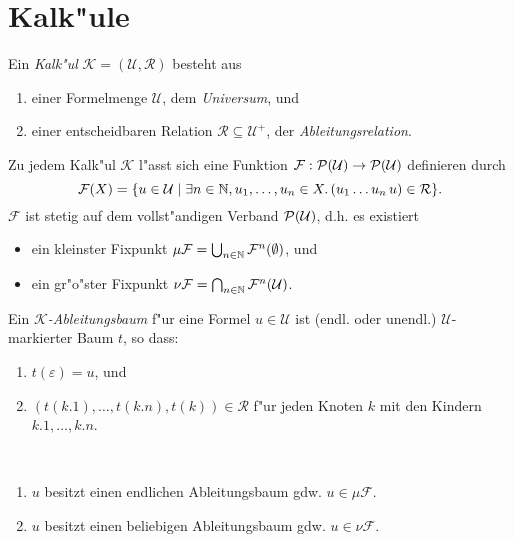 \documentclass[12pt,a4paper,final]{article}
\begin{document}

\section{Kalk"ule}
\label{sec:Kalkuele}

\begin{definition}[Kalk"ul]
  Ein \emph{Kalk"ul} \mbox{$\mathcal{K} = (\mathcal{U}, \mathcal{R})$} besteht aus
  \begin{enumerate}
  \item einer Formelmenge $\mathcal{U}$, dem \emph{Universum}, und
  \item einer entscheidbaren Relation $\mathcal{R} \subseteq \mathcal{U}^+$, der \emph{Ableitungsrelation}.
  \end{enumerate}
\end{definition}
Zu jedem Kalk"ul $\mathcal{K}$ l"asst sich eine Funktion
\mbox{$\mathcal{F}:\operatorname{\mathcal{P}}(\mathcal{U}) \to \operatorname{\mathcal{P}}(\mathcal{U})$} definieren durch
\begin{equation*}
\mathcal{F}(X) = \{u \in \mathcal{U} \mid \exists n\in\mathbb N,u_1,\ldots,u_n\in X.\,(u_1 \ldots u_n\,u) \in\mathcal{R}\}.
\end{equation*}
$\mathcal{F}$ ist stetig auf dem vollst"andigen Verband $\operatorname{\mathcal{P}}(\mathcal{U})$, d.h. es
existiert
\begin{itemize}
\item ein kleinster Fixpunkt $\mu\mathcal{F} = \bigcup_{n\in\mathbb N}\mathcal{F}^n(\emptyset)$, und
\item ein gr"o"ster Fixpunkt $\nu\mathcal{F} = \bigcap_{n\in\mathbb N}\mathcal{F}^n(\mathcal{U})$.
\end{itemize}
Ein \emph{$\mathcal{K}$-Ableitungsbaum} f"ur eine Formel $u \in \mathcal{U}$ ist (endl. oder unendl.)
$\mathcal{U}$-markierter Baum $t$, so dass:
\begin{enumerate}
\item $t(\varepsilon) = u$, und
\item $(t(k.1),\ldots,t(k.n),t(k)) \in \mathcal{R}$ f"ur jeden Knoten $k$ mit den Kindern $k.1,\ldots,k.n$.
\end{enumerate}

\begin{theorem} \
  \begin{enumerate}
  \item $u$ besitzt einen endlichen Ableitungsbaum gdw. $u \in \mu\mathcal{F}$.
  \item $u$ besitzt einen beliebigen Ableitungsbaum gdw. $u \in \nu\mathcal{F}$.
  \end{enumerate}
\end{theorem}
\end{document}
